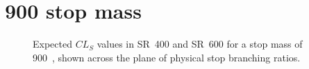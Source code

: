 \FloatBarrier

\newpage
\section{900 \texorpdfstring{\GeV}{GeV} stop mass}

\begin{figure}[ht]
  \centering
  \caption{
    Expected $CL_S$ values in SR~400 and SR~600 for a stop mass of 900~\GeV,
    shown across the plane of physical stop branching ratios.
  }
\end{figure}

